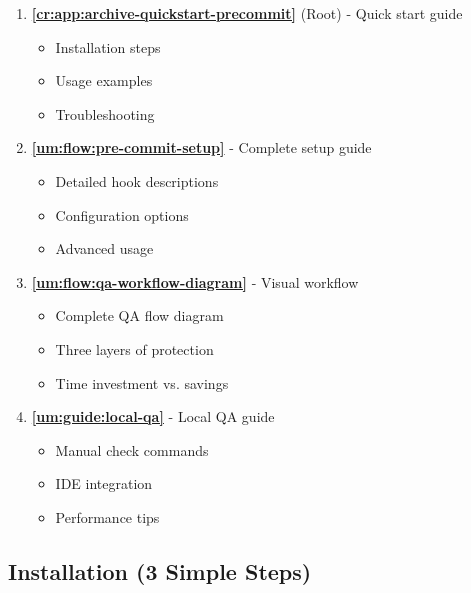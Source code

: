\begin{record}

\begin{enumerate}
\def\labelenumi{\arabic{enumi}.}
\item
  \textbf{\cref{cr:app:archive-quickstart-precommit}} (Root) - Quick start guide

  \begin{itemize}
  \tightlist
  \item
    Installation steps
  \item
    Usage examples
  \item
    Troubleshooting
  \end{itemize}
\item
  \textbf{\cref{um:flow:pre-commit-setup}} - Complete setup guide

  \begin{itemize}
  \tightlist
  \item
    Detailed hook descriptions
  \item
    Configuration options
  \item
    Advanced usage
  \end{itemize}
\item
  \textbf{\cref{um:flow:qa-workflow-diagram}} - Visual workflow

  \begin{itemize}
  \tightlist
  \item
    Complete QA flow diagram
  \item
    Three layers of protection
  \item
    Time investment vs. savings
  \end{itemize}
\item
  \textbf{\cref{um:guide:local-qa}} - Local QA guide

  \begin{itemize}
  \tightlist
  \item
    Manual check commands
  \item
    IDE integration
  \item
    Performance tips
  \end{itemize}
\end{enumerate}

\end{record}

\subsection{Installation (3 Simple Steps)}\label{cr:app:archive-pre-commit-setup-summary:installation-3-simple-steps}

